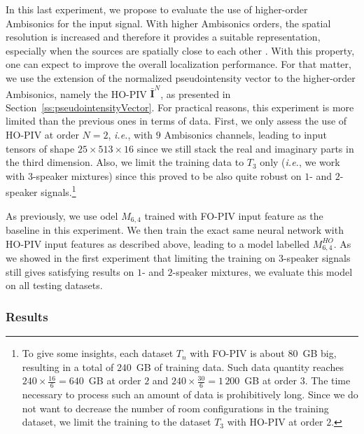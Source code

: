 In this last experiment, we propose to evaluate the use of higher-order Ambisonics for the input signal. With higher Ambisonics orders, the spatial resolution is increased and therefore it provides a suitable representation, especially when the sources are spatially close to each other \cite{zotter_ambisonics_2019}. With this property, one can expect to improve the overall localization performance. For that matter, we use the extension of the normalized pseudointensity vector to the higher-order Ambisonics, namely the HO-PIV $\mathbf{\bar{I}}^N$, as presented in Section~\ref{ss:pseudointensityVector}. For practical reasons, this experiment is more limited than the previous ones in terms of data. First, we only assess the use of HO-PIV at order $N=2$, \emph{i.e.}, with $9$ Ambisonics channels, leading to input tensors of shape $25 \times 513 \times 16$ since we still stack the real and imaginary parts in the third dimension. Also, we limit the training data to $T_3$ only (\emph{i.e.}, we work with $3$-speaker mixtures) since this proved to be also quite robust on $1$- and $2$-speaker signals.\footnote{To give some insights, each dataset $T_n$ with FO-PIV is about $80$~GB big, resulting in a total of $240$~GB of training data. Such data quantity reaches $240 \times \frac{16}{6} = 640$~GB at order $2$ and $240 \times \frac{30}{6} = 1\,200$~GB at order $3$. The time necessary to process such an amount of data is prohibitively long. Since we do not want to decrease the number of room configurations in the training dataset, we limit the training to the dataset $T_3$ with HO-PIV at order $2$.}

As previously, we use odel $M_{6,4}$ trained with FO-PIV input feature as the baseline in this experiment. We then train the exact same neural network with HO-PIV input features as described above, leading to a model labelled $M^{HO}_{6,4}$. As we showed in the first experiment that limiting the training on $3$-speaker signals still gives satisfying results on $1$- and $2$-speaker mixtures, we evaluate this model on all testing datasets.

\subsubsection{Results}

